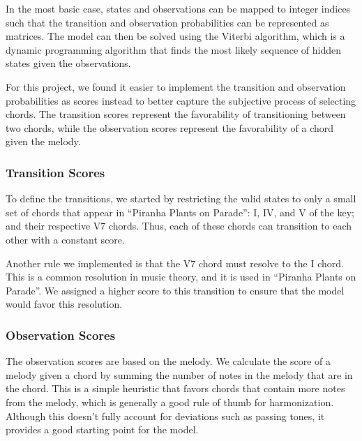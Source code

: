 

In the most basic case, states and observations can be mapped to integer indices such that the transition and observation probabilities can be represented as matrices. The model can then be solved using the Viterbi algorithm, which is a dynamic programming algorithm that finds the most likely sequence of hidden states given the observations.

For this project, we found it easier to implement the transition and observation probabilities as scores instead to better capture the subjective process of selecting chords. The transition scores represent the favorability of transitioning between two chords, while the observation scores represent the favorability of a chord given the melody.

\subsubsection{Transition Scores}

To define the transitions, we started by restricting the valid states to only a small set of chords that appear in ``Piranha Plants on Parade'': I, IV, and V of the key; and their respective V7 chords. Thus, each of these chords can transition to each other with a constant score.

Another rule we implemented is that the V7 chord must resolve to the I chord. This is a common resolution in music theory, and it is used in ``Piranha Plants on Parade''. We assigned a higher score to this transition to ensure that the model would favor this resolution.

\subsubsection{Observation Scores}

The observation scores are based on the melody. We calculate the score of a melody given a chord by summing the number of notes in the melody that are in the chord. This is a simple heuristic that favors chords that contain more notes from the melody, which is generally a good rule of thumb for harmonization. Although this doesn't fully account for deviations such as passing tones, it provides a good starting point for the model.
